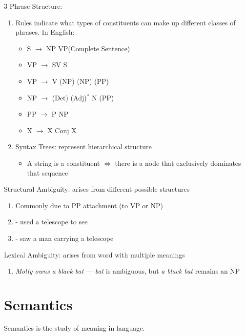 \documentclass[12pt, a4paper]{article}
\begin{document}
\begin{multicols*}{3}
Phrase Structure:
\begin{enumerate}[\roman*.]
  \item Rules indicate what types of constituents can make up different classes of phrases. In English:
    \begin{itemize}[leftmargin=*]\vspace{3pt}
      \item S $\rightarrow$ NP VP\hfill(Complete Sentence)
      \item VP $\rightarrow$ SV S
      \item VP $\rightarrow$ V (NP) (NP) (PP)
      \item NP $\rightarrow$ (Det) (Adj)$^*$ N (PP)
      \item PP $\rightarrow$ P NP
      \item X $\rightarrow$ X Conj X
    \end{itemize}
  \item Syntax Trees: represent hierarchical structure 
    \begin{itemize}[leftmargin=*]\vspace{3pt}
      \item A string is a constituent $\Leftrightarrow$ there is a node that exclusively dominates that sequence
    \end{itemize}
\end{enumerate}
{\centering{}\par}\vspace{-1em}

\colbreak
Structural Ambiguity: arises from different possible structures 
\begin{enumerate}[\roman*.]
  \item Commonly due to PP attachment (to VP or NP)
  \item {} - used a telescope to see
  \item {} - saw a man carrying a telescope
\end{enumerate}

Lexical Ambiguity: arises from word with multiple meanings 
\begin{enumerate}[\roman*.]
  \item \textit{Molly owns a black bat} --- \textit{bat} is ambiguous, but \textit{a black bat} remains an NP
\end{enumerate}

\colbreak
\section{Semantics}
Semantics is the study of meaning in language.


\end{multicols*}
\end{document}
